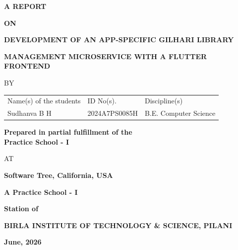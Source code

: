 \documentclass{book}
\begin{document}


\large

\thispagestyle{empty}
\centerline{\bf A REPORT}
\vspace*{0.3cm}
\centerline{\bf ON}
\vspace*{0.3cm}
\centerline{\bf DEVELOPMENT OF AN APP-SPECIFIC GILHARI LIBRARY}
\centerline{\bf MANAGEMENT MICROSERVICE WITH A FLUTTER FRONTEND} 
\vspace*{2cm}

\centerline{BY}
\vspace*{1cm}

\begin{center}
	\begin{tabular}{lll} 
		Name(s) of the students & \hspace*{2cm} ID No(s). & \hspace*{2cm} Discipline(s) \\ 
		Sudhanva B H &\hspace*{2cm} 2024A7PS0085H &\hspace*{2cm} B.E. Computer Science \\
	\end{tabular}
\end{center}

\vspace*{2cm}
\begin{center}
	{\bf Prepared in partial fulfillment of the \\
	Practice School - I} \\ 
\end{center}

\vspace*{0.5cm}

\centerline{AT}

\vspace*{1cm}
        \centerline{\bf Software Tree, California, USA} 
	\vspace{0.2cm}
	\centerline{\bf A Practice School - I}
	\vspace{0.2cm}
	\centerline{\bf Station of}
	\vspace{0.5cm}
\begin{figure}[ht]
\epsfxsize=1.0in
\centerline{}
\end{figure}

	\centerline{\bf BIRLA INSTITUTE OF TECHNOLOGY \& SCIENCE, PILANI}
	\vspace*{0.5cm}
	\centerline{\bf June, 2026} 
	\newpage

\thispagestyle{empty}
\end{document}
